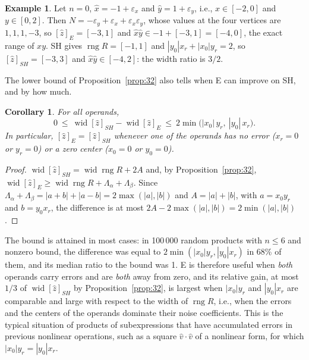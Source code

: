 \documentclass[10pt]{article}
\newtheorem{corollary}[theorem]{Corollary}
\theoremstyle{definition}
\newtheorem{example}[theorem]{Example}
\newcommand{\eps}{\varepsilon}
\newcommand{\ex}{\eps_x}
\newcommand{\ey}{\eps_y}
\newcommand{\rng}{\operatorname{rng}}
\newcommand{\wid}{\operatorname{wid}}
\begin{document}
\begin{example}
\label{ex:32}
Let $n=0$, $\hat x = -1+\ex$ and $\hat y = 1+\ey$, i.e., $x\in[-2,0]$ and $y\in[0,2]$. Then $N = -\ey+\ex+\ex\ey$, whose values at the four vertices are $1,1,1,-3$, so $[\hat z]_E=[-3,1]$ and $\hat x\hat y\in -1+[-3,1]=[-4,0]$, the exact range of $xy$. SH gives $\rng R=[-1,1]$ and $|y_0|x_r+|x_0|y_r = 2$, so $[\hat z]_{SH}=[-3,3]$ and $\hat x\hat y\in[-4,2]$: the width ratio is $3/2$.
\end{example}

The lower bound of Proposition~\ref{prop:32} also tells when E can improve on SH, and by how much.

\begin{corollary}
\label{cor:gain}
For all operands,
\[
0\ \le\ \wid[\hat z]_{SH}-\wid[\hat z]_E\ \le\ 2\min\big(|x_0|\,y_r,\ |y_0|\,x_r\big).
\]
In particular, $[\hat z]_E=[\hat z]_{SH}$ whenever one of the operands has no error ($x_r=0$ or $y_r=0$) or a zero center ($x_0=0$ or $y_0=0$).
\end{corollary}
\begin{proof}
$\wid[\hat z]_{SH}=\wid\rng R+2A$ and, by Proposition~\ref{prop:32}, $\wid[\hat z]_E\ge\wid\rng R+\Lambda_\alpha+\Lambda_\beta$. Since $\Lambda_\alpha+\Lambda_\beta = |a+b|+|a-b| = 2\max(|a|,|b|)$ and $A=|a|+|b|$, with $a=x_0y_r$ and $b=y_0x_r$, the difference is at most $2A-2\max(|a|,|b|)=2\min(|a|,|b|)$.
\end{proof}

The bound is attained in most cases: in 100\,000 random products with $n\le6$ and nonzero bound, the difference was equal to $2\min(|x_0|y_r,|y_0|x_r)$ in 68\% of them, and its median ratio to the bound was 1. E is therefore useful when \emph{both} operands carry errors and are \emph{both} away from zero, and its relative gain, at most $1/3$ of $\wid[\hat z]_{SH}$ by Proposition~\ref{prop:32}, is largest when $|x_0|y_r$ and $|y_0|x_r$ are comparable and large with respect to the width of $\rng R$, i.e., when the errors and the centers of the operands dominate their noise coefficients. This is the typical situation of products of subexpressions that have accumulated errors in previous nonlinear operations, such as a square $\hat v\cdot\hat v$ of a nonlinear form, for which $|x_0|y_r=|y_0|x_r$.
\end{document}
